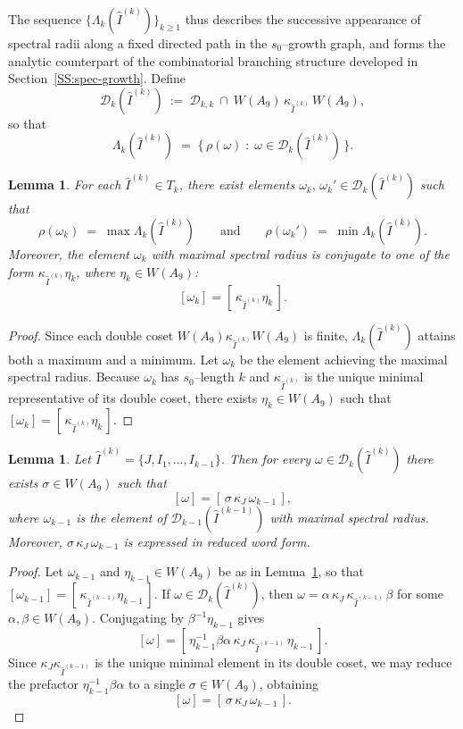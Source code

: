 \documentclass[11pt]{amsart}
\numberwithin{equation}{section}
\newtheorem{lem}[thm]{Lemma}
\begin{document}
The sequence
$\{\Lambda_k(\widehat I^{(k)})\}_{k\ge1}$
thus describes the successive appearance of spectral radii
along a fixed directed path in the $s_0$--growth graph,
and forms the analytic counterpart of the combinatorial
branching structure developed in
Section~\ref{SS:spec-growth}.
\medskip
Define
\[
\mathcal{D}_k(\widehat I^{(k)})\ :=\
\mathcal{D}_{k,k}\ \cap\
W(A_9)\,\kappa_{\widehat I^{(k)}}\,W(A_9),
\]
so that
\[
\Lambda_k(\widehat I^{(k)}) \;=\;
\{\,
\rho(\omega)
\;:\;
\omega \in \mathcal{D}_k(\widehat I^{(k)})
\,\}.
\]
\begin{lem}\label{L:maxE}
For each $\widehat I^{(k)}\in T_k$, there exist elements
$\omega_k,\,\omega_k' \in \mathcal{D}_k(\widehat I^{(k)})$ such that
\[
\rho(\omega_k)
\;=\;
\max \Lambda_k(\widehat I^{(k)})
\qquad\text{and}\qquad
\rho(\omega_k')
\;=\;
\min \Lambda_k(\widehat I^{(k)}).
\]
Moreover, the element $\omega_k$ with maximal spectral radius is
conjugate to one of the form $\kappa_{\widehat I^{(k)}}\eta_k$,
where $\eta_k\in W(A_9)$:
\[
[\omega_k] = [\,\kappa_{\widehat I^{(k)}}\eta_k\,].
\]
\end{lem}

\begin{proof}
Since each double coset $W(A_9)\kappa_{\widehat I^{(k)}}W(A_9)$
is finite, $\Lambda_k(\widehat I^{(k)})$ attains both a maximum and
a minimum.  Let $\omega_k$ be the element achieving the maximal spectral
radius.  Because $\omega_k$ has $s_0$--length $k$ and
$\kappa_{\widehat I^{(k)}}$ is the unique minimal representative
of its double coset, there exists $\eta_k\in W(A_9)$ such that
$[\omega_k]=[\,\kappa_{\widehat I^{(k)}}\eta_k\,]$.
\end{proof}

\begin{lem}\label{L:subwords}
Let $\widehat I^{(k)}=\{J,I_1,\dots,I_{k-1}\}$.
Then for every $\omega\in\mathcal{D}_k(\widehat I^{(k)})$
there exists $\sigma\in W(A_9)$ such that
\[
[\omega] = [\,\sigma\,\kappa_J\,\omega_{k-1}\,],
\]
where $\omega_{k-1}$ is the element of
$\mathcal{D}_{k-1}(\widehat I^{(k-1)})$
with maximal spectral radius.
Moreover, $\sigma\,\kappa_J\,\omega_{k-1}$ is expressed in reduced word form.
\end{lem}

\begin{proof}
Let $\omega_{k-1}$ and $\eta_{k-1}\in W(A_9)$ be as in
Lemma~\ref{L:maxE}, so that
$[\omega_{k-1}]=[\,\kappa_{\widehat I^{(k-1)}}\eta_{k-1}\,]$.
If $\omega\in\mathcal{D}_k(\widehat I^{(k)})$, then
$\omega=\alpha\,\kappa_J\,\kappa_{\widehat I^{(k-1)}}\,\beta$
for some $\alpha,\beta\in W(A_9)$.
Conjugating by $\beta^{-1}\eta_{k-1}$ gives
\[
[\omega]
=
[\,\eta_{k-1}^{-1}\beta\alpha\,\kappa_J\,
  \kappa_{\widehat I^{(k-1)}}\,\eta_{k-1}\,].
\]
Since $\kappa_J\kappa_{\widehat I^{(k-1)}}$
is the unique minimal element in its double coset,
we may reduce the prefactor
$\eta_{k-1}^{-1}\beta\alpha$ to a single
$\sigma\in W(A_9)$, obtaining
\[
[\omega]=[\,\sigma\,\kappa_J\,\omega_{k-1}\,].
\]
\end{proof}
\end{document}
